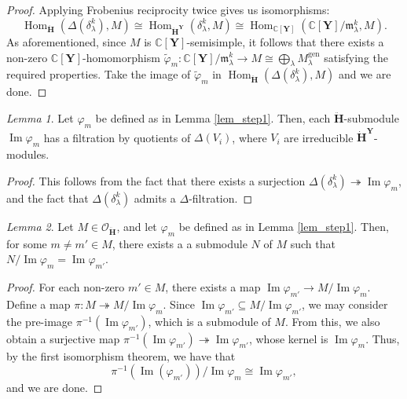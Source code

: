 \documentclass[a4paper]{report}
\theoremstyle{theorem}
\theoremstyle{definition}
\theoremstyle{remark}
\theoremstyle{proposition}
\theoremstyle{conjecture}
\theoremstyle{lemma}
\newtheorem{lemma}{Lemma}
\theoremstyle{corollary}
\theoremstyle{exercise}
\theoremstyle{example}
\newcommand{\C}{\mathbb{C}}
\newcommand{\mcal}{\mathcal}
\newcommand{\on}{\operatorname}
\begin{document}
  \begin{proof}
      Applying Frobenius reciprocity twice gives us isomorphisms:
      $$\on{Hom}_{\mathbf{\ddot{\mathbf{H}}}}(\Delta(\delta_\lambda^k),M) \cong \on{Hom}_{\mathbf{\dot{H}}^{\mathbf{Y}}}(\delta_\lambda^k,M) \cong \on{Hom}_{\C[\mathbf{Y}]}(\C[\mathbf{Y}]/\mathfrak{m}_\lambda^k, M).$$
      As aforementioned, since $M$ is $\C[\mathbf{Y}]$-semisimple, 
      it follows that there exists a non-zero $\C[\mathbf{Y}]$-homomorphism 
      $\widetilde{\varphi}_m : \C[\mathbf{Y}]/\mathfrak{m}_\lambda^k \to M \cong \bigoplus_\lambda M_\lambda^{\on{gen}}$
      satisfying the required properties. Take the image of 
      $\widetilde{\varphi}_m$ in $\on{Hom}_{\mathbf{\ddot{\mathbf{H}}}}(\Delta(\delta_\lambda^k),M)$ and we are done.
  \end{proof}
  
  \begin{lemma}\label{lem_step3}
      Let $\varphi_m$ be defined as in Lemma \ref{lem_step1}.
      Then, each $\mathbf{\ddot{\mathbf{H}}}$-submodule $\on{Im}\varphi_m$ has a filtration
      by quotients of $\Delta(V_i)$, where $V_i$ are irreducible 
      $\mathbf{\dot{H}}^{\mathbf{Y}}$-modules.
  \end{lemma}
  
  \begin{proof}
      This follows from the fact that there exists a surjection
      $\Delta(\delta_\lambda^k) \twoheadrightarrow \on{Im}\varphi_m$, and the 
      fact that $\Delta(\delta_\lambda^k)$ admits a $\Delta$-filtration.
  \end{proof}
  
  \begin{lemma}\label{lem_step3_iter}
      Let $M \in \mcal{O}_{\mathbf{\ddot{\mathbf{H}}}}$, and let $\varphi_m$ be defined as 
      in Lemma \ref{lem_step1}. Then, for some $m\neq m' \in M$, there exists a 
      a submodule $N$ of $M$ such that 
      $N/\on{Im}\varphi_{m} = \on{Im}\varphi_{m'}$.
  \end{lemma}
  
  \begin{proof}
      For each non-zero $m' \in M$, there exists a map 
      $\on{Im}\varphi_{m'} \to M/\on{Im}\varphi_m$. 
      Define a map $\pi : M \twoheadrightarrow M/\on{Im}\varphi_m$. 
      Since $\on{Im}\varphi_{m'} \subseteq M/\on{Im}\varphi_{m'}$, 
      we may consider the pre-image $\pi^{-1}(\on{Im}\varphi_{m'})$, which is a 
      submodule of $M$.
      From this, we also obtain a surjective map
      $\pi^{-1}(\on{Im}\varphi_{m'}) \twoheadrightarrow \on{Im}\varphi_{m'}$,
      whose kernel is $\on{Im}\varphi_m$. Thus, 
      by the first isomorphism theorem, we have that 
      $$\pi^{-1}(\on{Im}(\varphi_{m'})) / \on{Im}\varphi_m \cong \on{Im}\varphi_{m'},$$
      and we are done.
  \end{proof}
  
\end{document}

